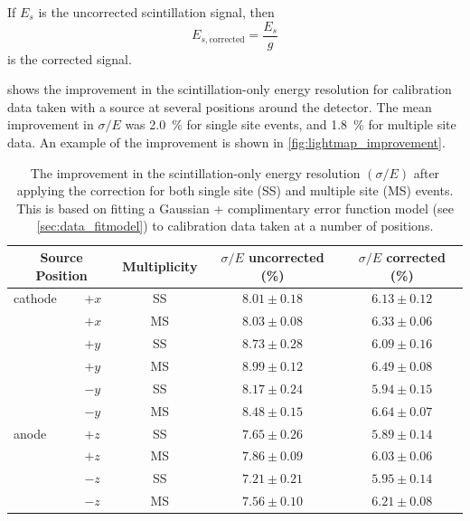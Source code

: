 \documentclass[herrin-thesis.tex]{subfiles}
\begin{document}
If \(E_{s}\) is the uncorrected scintillation signal, then
\begin{equation}
E_{s,\text{corrected}} = \frac{E_s}{g}
\label{eq:lightmap_corrected_signal}
\end{equation}
is the corrected signal.

 shows the improvement in the scintillation-only energy resolution for calibration data taken with a  source at several positions around the detector. The mean improvement in \(\sigma/E\) was \SI{2.0}{\percent} for single site events, and \SI{1.8}{\percent} for multiple site data. An example of the improvement is shown in \cref{fig:lightmap_improvement}.

\begin{table}[tbh]
\centering
\caption[Resolution improvement due to correction]{The improvement in the scintillation-only energy resolution \((\sigma/E)\) after applying the correction for both single site (SS) and multiple site (MS) events. This is based on fitting a Gaussian + complimentary error function model (see \ref{sec:data_fitmodel}) to  calibration data taken at a number of positions.}
\label{tab:lightmap_effect}
\begin{tabular}{l l c c c}\toprule
\multicolumn{2}{c}{Source Position}	&	Multiplicity	&	\(\sigma/E\) uncorrected (\%)	&	\(\sigma/E\) corrected (\%)		\\\midrule
cathode	&	\(+x\)				&	SS			&	\(8.01\pm0.18\)					&	\(6.13\pm0.12\)					\\
		&	\(+x\)				&	MS			&	\(8.03\pm0.08\)					&	\(6.33\pm0.06\)					\\
		&	\(+y\)				&	SS			&	\(8.73\pm0.28\)					&	\(6.09\pm0.16\)					\\
		&	\(+y\)				&	MS			&	\(8.99\pm0.12\)					&	\(6.49\pm0.08\)					\\
		&	\(-y\)				&	SS			&	\(8.17\pm0.24\)					&	\(5.94\pm0.15\)					\\
		&	\(-y\)				&	MS			&	\(8.48\pm0.15\)					&	\(6.64\pm0.07\)					\\
anode	&	\(+z\)				&	SS			&	\(7.65\pm0.26\)					&	\(5.89\pm0.14\)					\\
		&	\(+z\)				&	MS			&	\(7.86\pm0.09\)					&	\(6.03\pm0.06\)					\\
		&	\(-z\)				&	SS			&	\(7.21\pm0.21\)					&	\(5.95\pm0.14\)					\\
		&	\(-z\)				&	MS			&	\(7.56\pm0.10\)					&	\(6.21\pm0.08\)					\\\bottomrule
\end{tabular}
\end{table}
\end{document}
